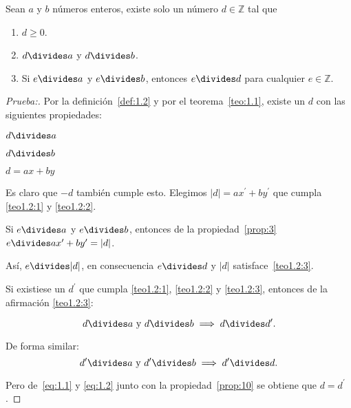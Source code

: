 \begin{theorem}\label{teo:1.2}
Sean $a$ y $b$ números enteros, existe solo un número $d\in\mathbb{Z}$ tal que

\begin{enumerate}[font={\bfseries},label={\arabic*)}]

\item\label{teo1.2:1} $d\geq0$.

\item\label{teo1.2:2} $d\divides a$ y $d\divides b$.

\item\label{teo1.2:3} Si $e\divides a$ y $e\divides b$, entonces $e\divides d$ para cualquier $e\in\mathbb{Z}$.

\end{enumerate}

\begin{proof}[Prueba:]
Por la definición~\ref{def:1.2} y por el teorema~\ref{teo:1.1}, existe un $d$ con las siguientes propiedades:
\begin{multicols}{3}
$d\divides a$

$d\divides b$

$d=ax+by$
\end{multicols}

\noindent
Es claro que $-d$ también cumple esto. Elegimos $|d|=ax^{\prime}+by^{\prime}$ que cumpla \ref{teo1.2:1} y \ref{teo1.2:2}.

\noindent
Si $e\divides a$ y $e\divides b$, entonces de la propiedad~\ref{prop:3} $e\divides ax^{\prime}+by^{\prime}=|d|$.
	
\noindent
Así, $e\divides |d|$, en consecuencia $e\divides d$ y $|d|$ satisface~\ref*{teo1.2:3}.
	
\noindent
Si existiese un $d^{\prime}$ que cumpla \ref{teo1.2:1}, \ref{teo1.2:2} y \ref{teo1.2:3}, entonces de la afirmación \ref{teo1.2:3}:

\begin{equation}\label{eq:1.1}
d\divides a\text{ y }d\divides b\implies d\divides d^{\prime}.
\end{equation}
	
\noindent
De forma similar:
\begin{equation}\label{eq:1.2}
d^{\prime}\divides a\text{ y }d^{\prime}\divides b\implies d^{\prime}\divides d.
\end{equation}

\noindent
Pero de~\eqref{eq:1.1} y \eqref{eq:1.2} junto con la propiedad~\ref{prop:10} se obtiene que $\boxed{d=d^{\prime}}$.
\end{proof}

\end{theorem}

